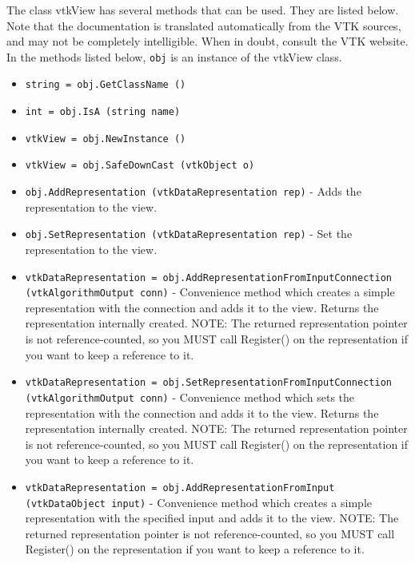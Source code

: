 The class vtkView has several methods that can be used.
  They are listed below.
Note that the documentation is translated automatically from the VTK sources,
and may not be completely intelligible.  When in doubt, consult the VTK website.
In the methods listed below, \verb|obj| is an instance of the vtkView class.
\begin{itemize}
\item  \verb|string = obj.GetClassName ()|

\item  \verb|int = obj.IsA (string name)|

\item  \verb|vtkView = obj.NewInstance ()|

\item  \verb|vtkView = obj.SafeDownCast (vtkObject o)|

\item  \verb|obj.AddRepresentation (vtkDataRepresentation rep)| -  Adds the representation to the view.

\item  \verb|obj.SetRepresentation (vtkDataRepresentation rep)| -  Set the representation to the view.

\item  \verb|vtkDataRepresentation = obj.AddRepresentationFromInputConnection (vtkAlgorithmOutput conn)| -  Convenience method which creates a simple representation with the 
 connection and adds it to the view.
 Returns the representation internally created.
 NOTE: The returned representation pointer is not reference-counted, 
 so you MUST call Register() on the representation if you want to 
 keep a reference to it.

\item  \verb|vtkDataRepresentation = obj.SetRepresentationFromInputConnection (vtkAlgorithmOutput conn)| -  Convenience method which sets the representation with the 
 connection and adds it to the view.
 Returns the representation internally created.
 NOTE: The returned representation pointer is not reference-counted, 
 so you MUST call Register() on the representation if you want to 
 keep a reference to it.

\item  \verb|vtkDataRepresentation = obj.AddRepresentationFromInput (vtkDataObject input)| -  Convenience method which creates a simple representation with the 
 specified input and adds it to the view.
 NOTE: The returned representation pointer is not reference-counted, 
 so you MUST call Register() on the representation if you want to 
 keep a reference to it.


\end{itemize}
